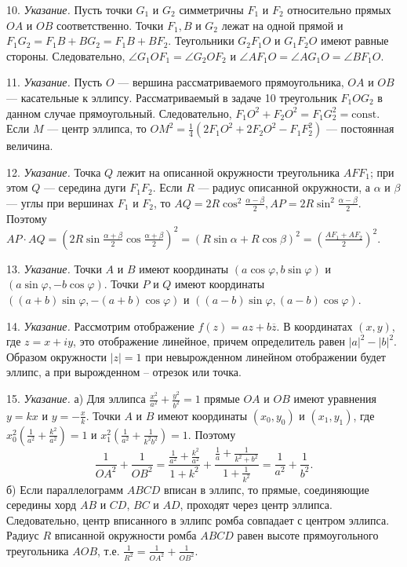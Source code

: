 10. \textit{Указание.} Пусть точки $G_1$ и $G_2$ симметричны $F_1$ и $F_2$ относительно прямых $OA$ и $OB$ соответственно. Точки $F_1, B$ и $G_2$ лежат на одной прямой и $F_1 G_2 = F_1 B + B G_2 = F_1 B + B F_2$. Теугольники $G_2 F_1 O$ и $G_1 F_2 O$ имеют равные стороны. Следовательно, $\angle G_1 O F_1 = \angle G_2 O F_2$ и $\angle A F_1 O = \angle A G_1 O = \angle B F_1 O$. 

11. \textit{Указание.} Пусть $O$ — вершина рассматриваемого прямоугольника, $OA$ и $OB$ — касательные к эллипсу. Рассматриваемый в задаче 10 треугольник $F_1 O G_2$ в данном случае прямоугольный. Следовательно, $F_1 O^2 + F_2 O^2 = F_1 G_2^2 = \text{const}$. Если $M$ — центр эллипса, то $OM^2 = \frac{1}{4}(2 F_1 O^2 + 2 F_2 O^2 - F_1 F_2^2)$ — постоянная величина.

12. \textit{Указание.} Точка $Q$ лежит на описанной окружности треугольника $A F F_1$; при этом $Q$ — середина дуги $F_1 F_2$. Если $R$ — радиус описанной окружности, а $\alpha$ и $\beta$ — углы при вершинах $F_1$ и $F_2$, то $AQ = 2R \cos^2 \frac{\alpha - \beta}{2}, AP = 2R \sin^2 \frac{\alpha - \beta}{2}$. Поэтому $AP \cdot AQ = \left(2R \sin \frac{\alpha + \beta}{2} \cos \frac{\alpha + \beta}{2}\right)^2 = (R \sin \alpha + R \cos \beta)^2 = \left(\frac{AF_1 + AF_2}{2}\right)^2$.

13. \textit{Указание.} Точки $A$ и $B$ имеют координаты $(a \cos \varphi, b \sin \varphi)$ и $(a \sin \varphi, -b \cos \varphi)$. Точки $P$ и $Q$ имеют координаты $((a + b) \sin \varphi, -(a + b) \cos \varphi)$ и $((a - b) \sin \varphi, (a - b) \cos \varphi)$.

14. \textit{Указание.} Рассмотрим отображение $f(z) = az + b \overline z$. В координатах $(x, y)$, где $z = x + iy$, это отображение линейное, причем определитель равен $|a|^2 - |b|^2$. Образом окружности $|z| = 1$ при невырожденном линейном отображении будет эллипс, а при вырожденном -- отрезок или точка.

15. \textit{Указание.} а) Для эллипса $\frac{x^2}{a^2} + \frac{y^2}{b^2} = 1$ прямые $OA$ и $OB$ имеют уравнения $y = kx$ и $y = -\frac{x}{k}$. Точки $A$ и $B$ имеют координаты $(x_0, y_0)$ и $(x_1, y_1)$, где $x_0^2\left(\frac{1}{a^2} + \frac{k^2}{a^2}\right) = 1$ и $x_1^2\left(\frac{1}{a^2} + \frac{1}{k^2b^2}\right) = 1$. Поэтому 
\[
	\frac{1}{OA^2} + \frac{1}{OB^2} = \frac{\frac{1}{a^2} + \frac{k^2}{a^2}}{1 + k^2} + \frac{\frac{1}{a} + \frac{1}{k^2 + b^2}}{1 + \frac{1}{k^2}}= \frac{1}{a^2} + \frac{1}{b^2}.
\]
б) Если параллелограмм $ABCD$ вписан в эллипс, то прямые, соединяющие середины хорд $AB$ и $CD$, $BC$ и $AD$, проходят через центр эллипса. Следовательно, центр вписанного в эллипс ромба совпадает с центром эллипса. Радиус $R$ вписанной окружности ромба $ABCD$ равен высоте прямоугольного треугольника $AOB$, т.е. $\frac{1}{R^2} = \frac{1}{OA^2} + \frac{1}{OB^2}$.

